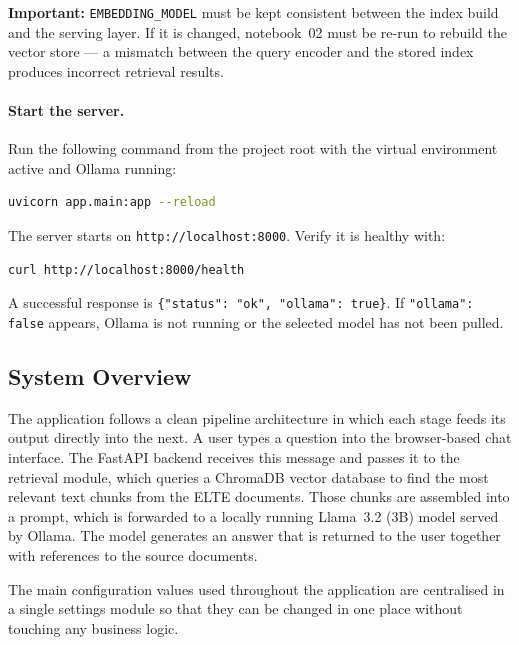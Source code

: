 \noindent\textbf{Important:} \texttt{EMBEDDING\_MODEL} must be kept consistent between the index build and the serving layer. If it is changed, notebook~02 must be re-run to rebuild the vector store — a mismatch between the query encoder and the stored index produces incorrect retrieval results.

\paragraph{Start the server.}
Run the following command from the project root with the virtual environment active and Ollama running:

\begin{lstlisting}[language=bash]
uvicorn app.main:app --reload
\end{lstlisting}

The server starts on \texttt{http://localhost:8000}. Verify it is healthy with:

\begin{lstlisting}[language=bash]
curl http://localhost:8000/health
\end{lstlisting}

A successful response is \texttt{\{"status": "ok", "ollama": true\}}. If \texttt{"ollama": false} appears, Ollama is not running or the selected model has not been pulled.

\subsection{System Overview}
\label{sec:impl-overview}

The application follows a clean pipeline architecture in which each stage feeds its output directly into the next. A user types a question into the browser-based chat interface. The FastAPI backend receives this message and passes it to the retrieval module, which queries a ChromaDB vector database to find the most relevant text chunks from the ELTE documents. Those chunks are assembled into a prompt, which is forwarded to a locally running Llama~3.2 (3B) model served by Ollama. The model generates an answer that is returned to the user together with references to the source documents.

The main configuration values used throughout the application are centralised in a single settings module so that they can be changed in one place without touching any business logic.


